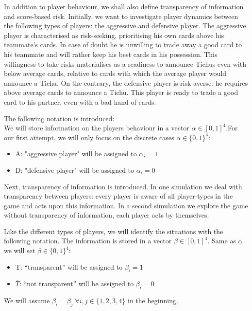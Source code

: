In addition to player behaviour, we shall also define transparency of information and score-based risk. Initially, we want to investigate player dynamics between the following types of players: the aggressive and defensive player. The aggressive player is characterised as risk-seeking, prioritising his own cards above his teammate’s cards. In case of doubt he is unwilling to trade away a good card to his teammate and will rather keep his best cards in his possession. This willingness to take risks materialises as a readiness to announce Tichus even with below average cards, relative to cards with which the average player would announce a Tichu. On the contrary, the defensive player is risk-averse: he requires above average cards to announce a Tichu. This player is ready to trade a good card to his partner, even with a bad hand of cards.

The following notation is introduced: \\We will store information on the players behaviour in a vector $\alpha \in [0,1]^4$.For our first attempt, we will only focus on the discrete cases $\alpha \in \{0,1\}^4$:
\\ 
\begin{itemize}
\item A: "aggressive player" will be assigned to $\alpha_i = 1$
\item D: "defensive player" will be assigned to $\alpha_i = 0$ \\
\end{itemize} 

Next, transparency of information is introduced. In one simulation we deal with transparency between players: every player is aware of all player-types in the game and acts upon this information. In a second simulation we explore the game without transparency of information, each player acts by themselves.

Like the different types of players, we will identify the situations with the following notation. The information is stored in a vector $\beta \in [0,1]^4$. Same as $\alpha$ we will set $\beta \in \{0,1\}^4$:
\\ 
\begin{itemize}
\item T: “transparent” will be assigned to $\beta_i = 1$
\item $\overline{T}$: “not transparent” will be assigned to $\beta_i = 0$ \\
\end{itemize}

We will assume  $\beta_i = \beta_j\;\forall i, j\in \{1,2,3,4\}$ in the beginning. 

